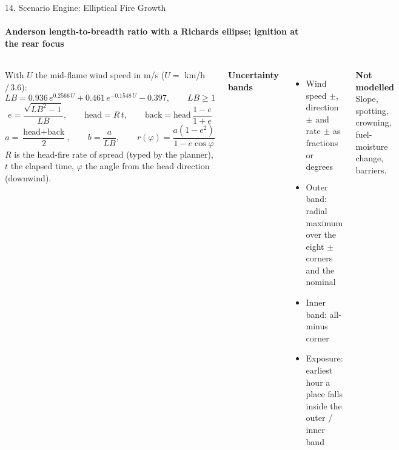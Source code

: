 \begin{frame}{14. Scenario Engine: Elliptical Fire Growth}
\framesubtitle{Anderson length-to-breadth ratio with a Richards ellipse; ignition at the rear focus}
\scriptsize
\begin{columns}[T,onlytextwidth]
    With $U$ the mid-flame wind speed in m/s ($U = $ km/h $/\,3.6$):
    \[
    LB = 0.936\,e^{0.2566\,U} + 0.461\,e^{-0.1548\,U} - 0.397,\qquad LB \ge 1
    \]
    \[
    e = \frac{\sqrt{LB^{2}-1}}{LB},\qquad
    \text{head} = R\,t,\qquad
    \text{back} = \text{head}\,\frac{1-e}{1+e}
    \]
    \[
    a = \frac{\text{head}+\text{back}}{2},\qquad
    b = \frac{a}{LB},\qquad
    r(\varphi)=\frac{a(1-e^{2})}{1-e\cos\varphi}
    \]
    $R$ is the head-fire rate of spread (typed by the planner), $t$ the elapsed time, $\varphi$ the angle from the head direction (downwind).

    \textbf{\textcolor{amritaMaroon}{Uncertainty bands}}
    \begin{itemize}\setlength\itemsep{2pt}
        \item Wind speed $\pm$, direction $\pm$ and rate $\pm$ as fractions or degrees
        \item Outer band: radial maximum over the eight $\pm$ corners and the nominal
        \item Inner band: all-minus corner
        \item Exposure: earliest hour a place falls inside the outer / inner band
    \end{itemize}
    \textbf{\textcolor{amritaMaroon}{Not modelled}}\\
    Slope, spotting, crowning, fuel-moisture change, barriers.
\end{columns}
\end{frame}

